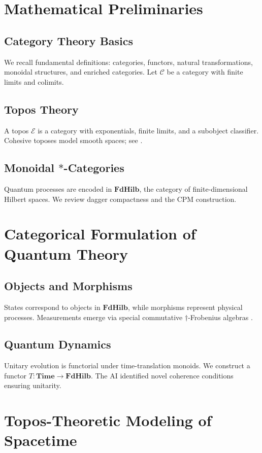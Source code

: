 \documentclass[11pt]{article}
\begin{document}
\section{Mathematical Preliminaries}
\subsection{Category Theory Basics}
We recall fundamental definitions: categories, functors, natural transformations, monoidal structures, and enriched categories. Let \(\mathcal{C}\) be a category with finite limits and colimits.

\subsection{Topos Theory}
A topos \(\mathcal{E}\) is a category with exponentials, finite limits, and a subobject classifier. Cohesive toposes model smooth spaces; see \cite{schreiber2013axiomatic, johnstone2002sketches}.

\subsection{Monoidal \(\ast\)-Categories}\label{sec:monoidal}
Quantum processes are encoded in \(\mathbf{FdHilb}\), the category of finite-dimensional Hilbert spaces. We review dagger compactness and the CPM construction.

\section{Categorical Formulation of Quantum Theory}
\subsection{Objects and Morphisms}
States correspond to objects in \(\mathbf{FdHilb}\), while morphisms represent physical processes. Measurements emerge via special commutative \(\dagger\)-Frobenius algebras \cite{coecke2011interacting}.

\subsection{Quantum Dynamics}
Unitary evolution is functorial under time-translation monoids. We construct a functor \(T: \mathbf{Time} \to \mathbf{FdHilb}\). The AI identified novel coherence conditions ensuring unitarity.

\section{Topos-Theoretic Modeling of Spacetime}
\end{document}
